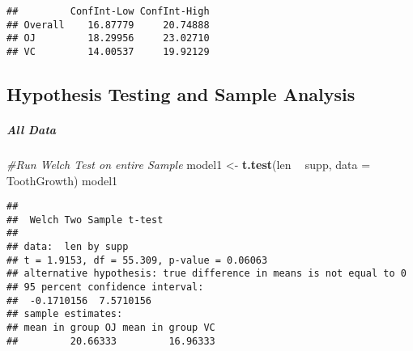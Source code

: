 \documentclass[]{article}
\newenvironment{Shaded}{\begin{snugshade}}{\end{snugshade}}
\newcommand{\CommentTok}[1]{\textcolor[rgb]{0.56,0.35,0.01}{\textit{#1}}}
\newcommand{\DataTypeTok}[1]{\textcolor[rgb]{0.13,0.29,0.53}{#1}}
\newcommand{\DecValTok}[1]{\textcolor[rgb]{0.00,0.00,0.81}{#1}}
\newcommand{\FloatTok}[1]{\textcolor[rgb]{0.00,0.00,0.81}{#1}}
\newcommand{\KeywordTok}[1]{\textcolor[rgb]{0.13,0.29,0.53}{\textbf{#1}}}
\newcommand{\NormalTok}[1]{#1}
\newcommand{\OperatorTok}[1]{\textcolor[rgb]{0.81,0.36,0.00}{\textbf{#1}}}
\newcommand{\StringTok}[1]{\textcolor[rgb]{0.31,0.60,0.02}{#1}}
\let\oldsubparagraph\subparagraph
\renewcommand{\subparagraph}[1]{\oldsubparagraph{#1}\mbox{}}
\begin{document}
\begin{verbatim}
##         ConfInt-Low ConfInt-High
## Overall    16.87779     20.74888
## OJ         18.29956     23.02710
## VC         14.00537     19.92129
\end{verbatim}

\hypertarget{hypothesis-testing-and-sample-analysis}{%
\subsection{Hypothesis Testing and Sample
Analysis}\label{hypothesis-testing-and-sample-analysis}}

\hypertarget{all-data}{%
\subparagraph{All Data}\label{all-data}}

\begin{Shaded}
\begin{Highlighting}[]
\CommentTok{#Run Welch Test on entire Sample}
\NormalTok{    model1 <-}\StringTok{ }\KeywordTok{t.test}\NormalTok{(len }\OperatorTok{~}\StringTok{ }\NormalTok{supp, }\DataTypeTok{data =}\NormalTok{ ToothGrowth)}
\NormalTok{    model1}
\end{Highlighting}
\end{Shaded}

\begin{verbatim}
## 
##  Welch Two Sample t-test
## 
## data:  len by supp
## t = 1.9153, df = 55.309, p-value = 0.06063
## alternative hypothesis: true difference in means is not equal to 0
## 95 percent confidence interval:
##  -0.1710156  7.5710156
## sample estimates:
## mean in group OJ mean in group VC 
##         20.66333         16.96333
\end{verbatim}

\begin{Shaded}
\end{Shaded}
\end{document}
